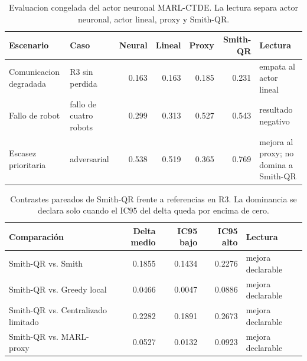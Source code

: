 \begin{table}[H]
\centering
\caption{Evaluacion congelada del actor neuronal MARL-CTDE. La lectura separa actor neuronal, actor lineal, proxy y Smith-QR.}
\label{tab:validation-suite-marl-neural}
\small
\begin{tabularx}{\textwidth}{@{}>{\raggedright\arraybackslash}p{}>{\raggedright\arraybackslash}p{}rrrr>{\raggedright\arraybackslash}X@{}}
\toprule
Escenario & Caso & Neural & Lineal & Proxy & Smith-QR & Lectura \\
\midrule
Comunicacion degradada & R3 sin perdida & 0.163 & 0.163 & 0.185 & 0.231 & empata al actor lineal \\
Fallo de robot & fallo de cuatro robots & 0.299 & 0.313 & 0.527 & 0.543 & resultado negativo \\
Escasez prioritaria & adversarial & 0.538 & 0.519 & 0.365 & 0.769 & mejora al proxy; no domina a Smith-QR \\
\bottomrule
\end{tabularx}
\end{table}

\begin{table}[H]
\centering
\caption{Contrastes pareados de Smith-QR frente a referencias en R3. La dominancia se declara solo cuando el IC95 del delta queda por encima de cero.}
\label{tab:validation-suite-deltas}
\small
\begin{tabularx}{\textwidth}{@{}>{\raggedright\arraybackslash}Xrrr>{\raggedright\arraybackslash}X@{}}
\toprule
Comparación & Delta medio & IC95 bajo & IC95 alto & Lectura \\
\midrule
Smith-QR vs. Smith & 0.1855 & 0.1434 & 0.2276 & mejora declarable \\
Smith-QR vs. Greedy local & 0.0466 & 0.0047 & 0.0886 & mejora declarable \\
Smith-QR vs. Centralizado limitado & 0.2282 & 0.1891 & 0.2673 & mejora declarable \\
Smith-QR vs. MARL-proxy & 0.0527 & 0.0132 & 0.0923 & mejora declarable \\
\bottomrule
\end{tabularx}
\end{table}
